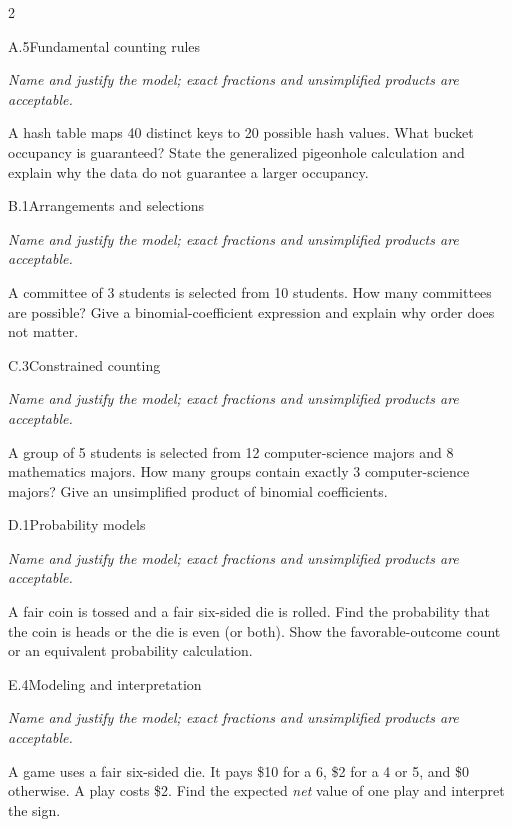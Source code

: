 \documentclass[9pt]{extarticle}
\begin{document}
\FormBreak
{}
\begin{multicols}{2}
\begin{CoreProblem}{A.5}{Fundamental counting rules}
{\scriptsize\textit{Name and justify the model; exact fractions and unsimplified products are acceptable.}\par}
A hash table maps 40 distinct keys to 20 possible hash values. What
    bucket occupancy is guaranteed? State the generalized pigeonhole calculation
    and explain why the data do not guarantee a larger occupancy.
\end{CoreProblem}
\begin{CoreProblem}{B.1}{Arrangements and selections}
{\scriptsize\textit{Name and justify the model; exact fractions and unsimplified products are acceptable.}\par}
A committee of 3 students is selected from 10 students. How many
    committees are possible? Give a binomial-coefficient expression and explain
    why order does not matter.
\end{CoreProblem}
\begin{CoreProblem}{C.3}{Constrained counting}
{\scriptsize\textit{Name and justify the model; exact fractions and unsimplified products are acceptable.}\par}
A group of 5 students is selected from 12 computer-science majors and
    8 mathematics majors. How many groups contain exactly 3 computer-science
    majors? Give an unsimplified product of binomial coefficients.
\end{CoreProblem}
\columnbreak
\begin{CoreProblem}{D.1}{Probability models}
{\scriptsize\textit{Name and justify the model; exact fractions and unsimplified products are acceptable.}\par}
A fair coin is tossed and a fair six-sided die is rolled. Find the
    probability that the coin is heads or the die is even (or both). Show the
    favorable-outcome count or an equivalent probability calculation.
\end{CoreProblem}
\begin{CoreProblem}{E.4}{Modeling and interpretation}
{\scriptsize\textit{Name and justify the model; exact fractions and unsimplified products are acceptable.}\par}
A game uses a fair six-sided die. It pays \$10 for a 6, \$2 for a 4
    or 5, and \$0 otherwise. A play costs \$2. Find the expected \emph{net}
    value of one play and interpret the sign.
\end{CoreProblem}
\end{multicols}
\end{document}
